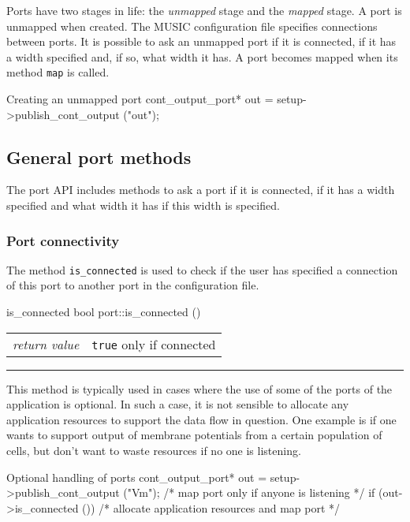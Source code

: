 \documentclass[a4paper]{report}
\makeatletter
\newenvironment{parameters}%
{\begin{tabular}{@{\hspace{2em}}lp{0.6\textwidth}}}%
{\end{tabular}\par\vspace{1mm}\par\hrule\par\vspace{5mm}}
\makeatother
\begin{document}
Ports have two stages in life: the \emph{unmapped} stage and the
\emph{mapped} stage.  A port is unmapped when created.  The MUSIC
configuration file specifies connections between ports.  It is
possible to ask an unmapped port if it is connected, if it has a width
specified and, if so, what width it has.  A port becomes mapped when
its method \lstinline|map| is called.

\begin{code}{Creating an unmapped port}
cont_output_port* out =
   setup->publish_cont_output ("out");
\end{code}

\subsection{General port methods}

The port API includes methods to ask a port if it is connected, if it
has a width specified and what width it has if this width is
specified.

\subsubsection{Port connectivity}

The method \lstinline|is_connected| is used to check if the user has
specified a connection of this port to another port in the
configuration file.

\begin{head}{is_connected}
  bool port::is_connected ()
\end{head}
\begin{parameters}
  \emph{return value} & \lstinline|true| only if connected\\
\end{parameters}

This method is typically used in cases where the use of some of the
ports of the application is optional.  In such a case, it is not
sensible to allocate any application resources to support the data
flow in question.  One example is if one wants to support output of
membrane potentials from a certain population of cells, but don't want
to waste resources if no one is listening.

\begin{code}{Optional handling of ports}
cont_output_port* out =
   setup->publish_cont_output ("Vm");
/* map port only if anyone is listening */
if (out->is_connected ())
  /* allocate application resources and map port */
\end{code}
\end{document}
